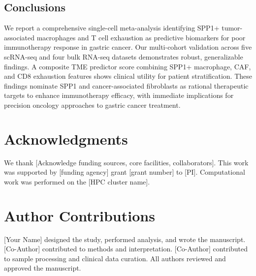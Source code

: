 \documentclass[12pt,twoside]{article}
\begin{document}
\subsection{Conclusions}

We report a comprehensive single-cell meta-analysis identifying SPP1+ tumor-associated macrophages and T cell exhaustion as predictive biomarkers for poor immunotherapy response in gastric cancer. Our multi-cohort validation across five scRNA-seq and four bulk RNA-seq datasets demonstrates robust, generalizable findings. A composite TME predictor score combining SPP1+ macrophage, CAF, and CD8 exhaustion features shows clinical utility for patient stratification. These findings nominate SPP1 and cancer-associated fibroblasts as rational therapeutic targets to enhance immunotherapy efficacy, with immediate implications for precision oncology approaches to gastric cancer treatment.


\section*{Acknowledgments}

We thank [Acknowledge funding sources, core facilities, collaborators]. This work was supported by [funding agency] grant [grant number] to [PI]. Computational work was performed on the [HPC cluster name].


\section*{Author Contributions}

[Your Name] designed the study, performed analysis, and wrote the manuscript. [Co-Author] contributed to methods and interpretation. [Co-Author] contributed to sample processing and clinical data curation. All authors reviewed and approved the manuscript.

\end{document}
